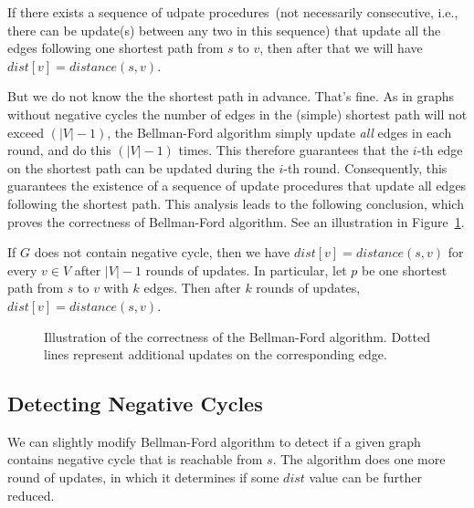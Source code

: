 \begin{fact}
\label{fact4}
If there exists a sequence of udpate procedures~(not necessarily consecutive,
i.e., there can be update(s) between any two in this sequence) that update all the edges following one shortest path
from $s$ to $v$, then after that we will have $dist[v] = distance(s, v)$.
\end{fact}

But we do not know the the shortest path in advance. That's fine.
As in graphs without negative cycles the number of edges in the (simple) shortest path will not exceed $(|V| - 1)$, the Bellman-Ford algorithm
simply update \emph{all} edges in each round, and do this $(|V| - 1)$ times.
This therefore guarantees that the $i$-th edge on the shortest path can be updated during the $i$-th round.
Consequently, this guarantees the existence of a sequence of update procedures that update all edges following the shortest path.
This analysis leads to the following conclusion, which proves the correctness of Bellman-Ford algorithm.
See an illustration in Figure~\ref{fig:bellman}.
\begin{fact}
\label{fact5}
If $G$ does not contain negative cycle,  then we have $dist[v] = distance(s,v)$ for every $v\in V$ after $|V| -1$ rounds of updates.
In particular, let $p$ be one shortest path from $s$ to $v$ with $k$ edges.  
Then after $k$ rounds of updates, $dist[v] = distance(s,v)$.
\end{fact}

\begin{figure}[h]
\centering{}
\caption{Illustration of the correctness of the Bellman-Ford algorithm.
Dotted lines represent additional updates on the corresponding edge.}
\label{fig:bellman}
\end{figure}



\subsection*{Detecting Negative Cycles}

We can slightly modify Bellman-Ford algorithm to detect if a given graph contains negative cycle that is reachable from $s$.
The algorithm does one more round of updates, in which it determines if some $dist$ value can be further reduced.

\begin{minipage}{0.8\textwidth}
	\xxx
	\xxx
	\xxx
	\xxx
	\xxx
	\xxx
	\xxx
	\xxx
	\xxx
	\xxx
	\xxx
	\xxx
	\xxx
\end{minipage}


